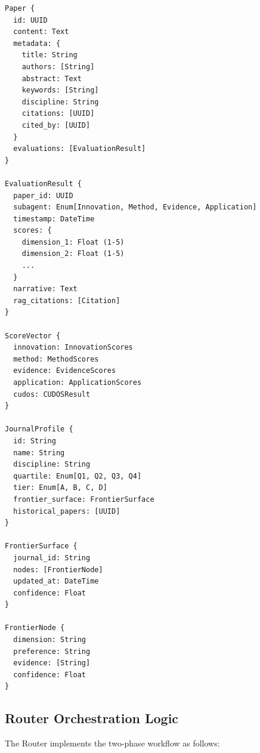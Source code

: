 \begin{verbatim}
Paper {
  id: UUID
  content: Text
  metadata: {
    title: String
    authors: [String]
    abstract: Text
    keywords: [String]
    discipline: String
    citations: [UUID]
    cited_by: [UUID]
  }
  evaluations: [EvaluationResult]
}

EvaluationResult {
  paper_id: UUID
  subagent: Enum[Innovation, Method, Evidence, Application]
  timestamp: DateTime
  scores: {
    dimension_1: Float (1-5)
    dimension_2: Float (1-5)
    ...
  }
  narrative: Text
  rag_citations: [Citation]
}

ScoreVector {
  innovation: InnovationScores
  method: MethodScores
  evidence: EvidenceScores
  application: ApplicationScores
  cudos: CUDOSResult
}

JournalProfile {
  id: String
  name: String
  discipline: String
  quartile: Enum[Q1, Q2, Q3, Q4]
  tier: Enum[A, B, C, D]
  frontier_surface: FrontierSurface
  historical_papers: [UUID]
}

FrontierSurface {
  journal_id: String
  nodes: [FrontierNode]
  updated_at: DateTime
  confidence: Float
}

FrontierNode {
  dimension: String
  preference: String
  evidence: [String]
  confidence: Float
}
\end{verbatim}

\subsection{Router Orchestration Logic}

The Router implements the two-phase workflow as follows:

